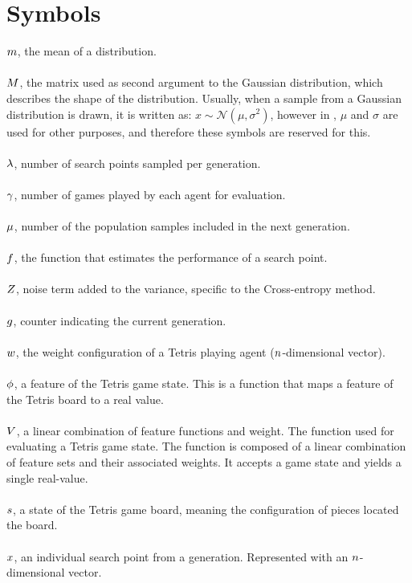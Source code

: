\clearpage
\thispagestyle{empty}
\section*{Symbols}

$m$, the mean of a distribution.\\
\\
$M$, the matrix used as 
second argument to the Gaussian distribution, 
which describes the shape of the distribution. 
Usually, when a sample from a Gaussian distribution 
is drawn, it is written as: 
$x \sim \mathcal{N} \left( \mu, \sigma^{2} \right)$, 
however in \citep{hansen2011},
$\mu$ and $\sigma$ are used for other 
purposes, and therefore these symbols are reserved for this.\\
\\
$\lambda$, number of search points sampled per generation.\\
\\
$\gamma$, number of games played by each agent for evaluation.\\
\\
$\mu$, number of the population samples included in the next generation.\\
\\
$f$, the function that estimates the performance of a search point.\\
\\
$Z$, noise term added to the variance, specific to the Cross-entropy method.\\
\\
$g$, counter indicating the current generation.\\
\\
$w$, the weight configuration of a Tetris playing agent ($n $-dimensional vector).\\
\\
$\phi$, a feature of the Tetris game state. This is a function that maps a 
feature of the Tetris board to a real value.\\
\\
$V$, a linear combination of feature functions and weight. 
The function used for evaluating a Tetris game state. 
The function is composed of a linear combination of feature sets and their
associated weights. It accepts a game state and yields a single real-value.\\
\\
$s$, a state of the Tetris game board, meaning the
configuration of pieces located the board.\\
\\
$x$, an individual search point from a generation. 
Represented with an $n$-dimensional vector.

\clearpage

